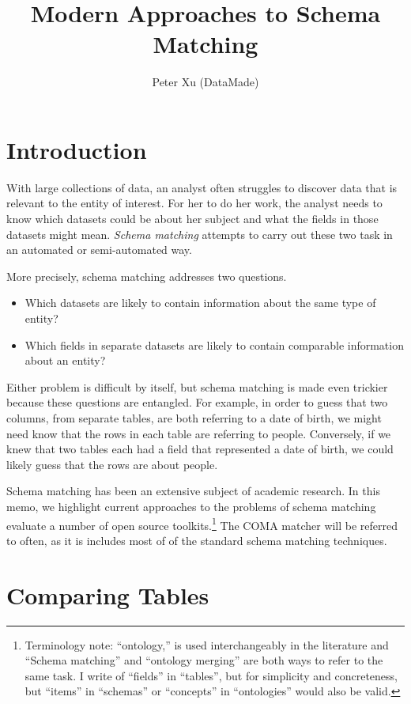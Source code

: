 \documentclass{datamade}
\title{Modern Approaches to Schema Matching}
\author{Peter Xu (DataMade)}
\theoremstyle{definition}
\theoremstyle{remark}
\begin{document}
	\maketitle
	
\section*{Introduction}

With large collections of data, an analyst often struggles to discover
data that is relevant to the entity of interest. For her to do her
work, the analyst needs to know which datasets could be about her
subject and what the fields in those datasets might mean. \emph{Schema
  matching} attempts to carry out these two task in an automated or
semi-automated way.

More precisely, schema matching addresses two questions.

\begin{itemize}
  \item Which datasets are likely to contain information about the
    same type of entity?
  \item Which fields in separate datasets are likely to contain comparable
    information about an entity?
\end{itemize}

Either problem is difficult by itself, but schema matching is made
even trickier because these questions are entangled. For example, in
order to guess that two columns, from separate tables, are both
referring to a date of birth, we might need know that the rows in each
table are referring to people. Conversely, if we knew that two tables
each had a field that represented a date of birth, we could likely
guess that the rows are about people.

Schema matching has been an extensive subject of academic research.
In this memo, we highlight current approaches to the problems of
schema matching evaluate a number of open source
toolkits.\footnote{Terminology note: ``ontology,'' is used
  interchangeably in the literature and ``Schema matching'' and
  ``ontology merging'' are both ways to refer to the same task. I
  write of ``fields'' in ``tables'', but for simplicity and
  concreteness, but ``items'' in ``schemas'' or ``concepts'' in
  ``ontologies'' would also be valid.}  The COMA matcher \cite{coma}
will be referred to often, as it is includes most of of the standard
schema matching techniques.


\section{Comparing Tables}
\end{document}
